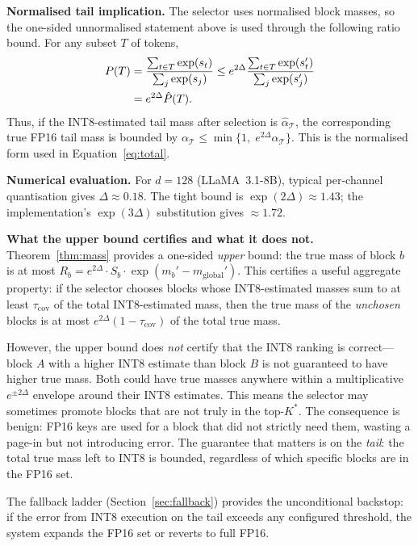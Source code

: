 \documentclass[10pt,twocolumn,a4paper]{article}
\theoremstyle{definition}
\theoremstyle{remark}
\begin{document}
\textbf{Normalised tail implication.}  The selector uses normalised block masses, so the one-sided unnormalised statement above is used through the following ratio bound.  For any subset $T$ of tokens,
\begin{align}
  P(T) &= \frac{\sum_{t\in T}\exp(s_t)}{\sum_j \exp(s_j)}
  \leq e^{2\Delta}
  \frac{\sum_{t\in T}\exp(s'_t)}{\sum_j \exp(s'_j)} \notag \\
  &= e^{2\Delta}\hat{P}(T).
\end{align}
Thus, if the INT8-estimated tail mass after selection is $\hat{\alpha}_{\mathcal{T}}$, the corresponding true FP16 tail mass is bounded by $\alpha_{\mathcal{T}} \leq \min\{1,\; e^{2\Delta}\hat{\alpha}_{\mathcal{T}}\}$.  This is the normalised form used in Equation~\eqref{eq:total}.

\textbf{Numerical evaluation.}  For $d = 128$ (LLaMA~3.1-8B), typical per-channel quantisation gives $\Delta \approx 0.18$.  The tight bound is $\exp(2\Delta) \approx 1.43$; the implementation's $\exp(3\Delta)$ substitution gives $\approx 1.72$.

\textbf{What the upper bound certifies and what it does not.}  Theorem~\ref{thm:mass} provides a one-sided \emph{upper} bound: the true mass of block $b$ is at most $R_b = e^{2\Delta} \cdot S_b \cdot \exp(m_b' - m_{\mathrm{global}}')$.  This certifies a useful aggregate property: if the selector chooses blocks whose INT8-estimated masses sum to at least $\tau_{\mathrm{cov}}$ of the total INT8-estimated mass, then the true mass of the \emph{unchosen} blocks is at most $e^{2\Delta} (1 - \tau_{\mathrm{cov}})$ of the total true mass.

However, the upper bound does \emph{not} certify that the INT8 ranking is correct---block $A$ with a higher INT8 estimate than block $B$ is not guaranteed to have higher true mass.  Both could have true masses anywhere within a multiplicative $e^{\pm 2\Delta}$ envelope around their INT8 estimates.  This means the selector may sometimes promote blocks that are not truly in the top-$K^*$.  The consequence is benign: FP16 keys are used for a block that did not strictly need them, wasting a page-in but not introducing error.  The guarantee that matters is on the \emph{tail}: the total true mass left to INT8 is bounded, regardless of which specific blocks are in the FP16 set.

The fallback ladder (Section~\ref{sec:fallback}) provides the unconditional backstop: if the error from INT8 execution on the tail exceeds any configured threshold, the system expands the FP16 set or reverts to full FP16.
\end{document}

